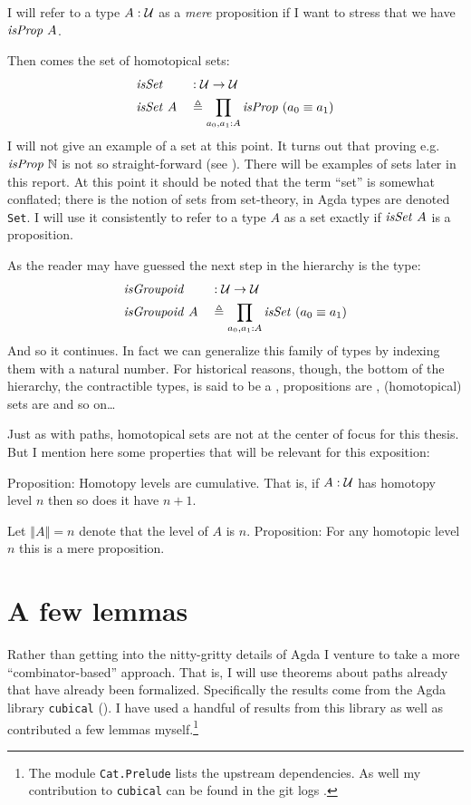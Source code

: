 I will refer to a type $A \mathrel{:} \mathcal{U}$ as a \emph{mere} proposition if I want to
stress that we have $\isProp\ A$.

Then comes the set of homotopical sets:
%
\begin{equation}
\begin{aligned}
& \isSet    && \tp \MCU \to \MCU \\
& \isSet\ A && \defeq \prod_{a_0, a_1 \tp A} \isProp\ (a_0 \equiv a_1)
\end{aligned}
\end{equation}
%
I will not give an example of a set at this point. It turns out that proving
e.g. $\isProp\ \bN$ is not so straight-forward (see \cite[\S3.1.4]{hott-2013}).
There will be examples of sets later in this report. At this point it should be
noted that the term ``set'' is somewhat conflated; there is the notion of sets
from set-theory, in Agda types are denoted \texttt{Set}. I will use it
consistently to refer to a type $A$ as a set exactly if $\isSet\ A$ is a
proposition.

As the reader may have guessed the next step in the hierarchy is the type:
%
\begin{equation}
\begin{aligned}
& \isGroupoid    && \tp \MCU \to \MCU \\
& \isGroupoid\ A && \defeq \prod_{a_0, a_1 \tp A} \isSet\ (a_0 \equiv a_1)
\end{aligned}
\end{equation}
%
And so it continues. In fact we can generalize this family of types by indexing
them with a natural number. For historical reasons, though, the bottom of the
hierarchy, the contractible types, is said to be a , propositions are , (homotopical)
sets are  and so on\ldots

Just as with paths, homotopical sets are not at the center of focus for this
thesis. But I mention here some properties that will be relevant for this
exposition:

Proposition: Homotopy levels are cumulative. That is, if $A \mathrel{:} \mathcal{U}$ has
homotopy level $n$ then so does it have $n + 1$.

Let $\left\Vert A \right\Vert = n$ denote that the level of $A$ is $n$.
Proposition: For any homotopic level $n$ this is a mere proposition.
%
\section{A few lemmas}
Rather than getting into the nitty-gritty details of Agda I venture to take a
more ``combinator-based'' approach. That is, I will use theorems about paths
already that have already been formalized. Specifically the results come from
the Agda library \texttt{cubical} (). I have used a handful of
results from this library as well as contributed a few lemmas myself.\footnote{The module \texttt{Cat.Prelude} lists the upstream dependencies. As well my contribution to \texttt{cubical} can be found in the git logs .}

